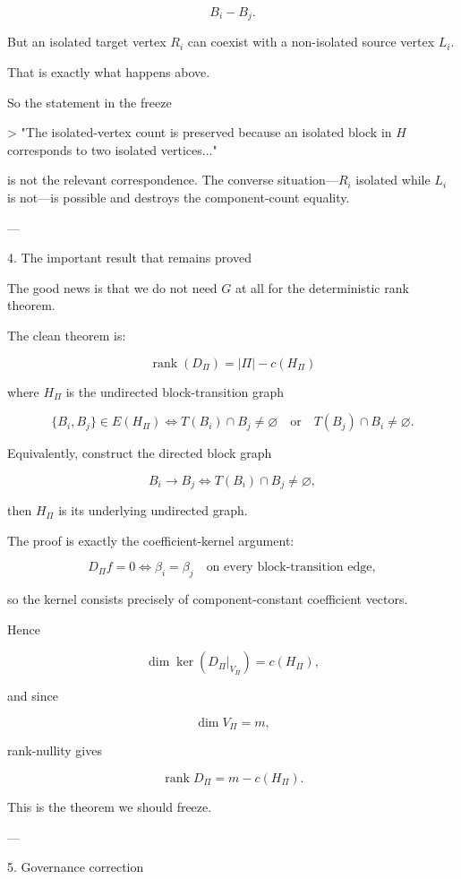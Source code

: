 \[
B_i-B_j.
\]

But an isolated target vertex \(R_i\) can coexist with a non-isolated source vertex \(L_i\).

That is exactly what happens above.

So the statement in the freeze

> "The isolated-vertex count is preserved because an isolated block in \(H\) corresponds to two isolated vertices..."



is not the relevant correspondence. The converse situation—\(R_i\) isolated while \(L_i\) is not—is possible and destroys the component-count equality.


---

4. The important result that remains proved

The good news is that we do not need \(G\) at all for the deterministic rank theorem.

The clean theorem is:

\[
\boxed{
\operatorname{rank}(D_\Pi)
=
|\Pi|-c(H_\Pi)
}
\]

where \(H_\Pi\) is the undirected block-transition graph

\[
\{B_i,B_j\}\in E(H_\Pi)
\iff
T(B_i)\cap B_j\neq\varnothing
\quad\text{or}\quad
T(B_j)\cap B_i\neq\varnothing.
\]

Equivalently, construct the directed block graph

\[
B_i\longrightarrow B_j
\iff
T(B_i)\cap B_j\neq\varnothing,
\]

then \(H_\Pi\) is its underlying undirected graph.

The proof is exactly the coefficient-kernel argument:

\[
D_\Pi f=0
\iff
\beta_i=\beta_j
\quad\text{on every block-transition edge},
\]

so the kernel consists precisely of component-constant coefficient vectors.

Hence

\[
\dim\ker(D_\Pi|_{V_\Pi})=c(H_\Pi),
\]

and since

\[
\dim V_\Pi=m,
\]

rank-nullity gives

\[
\boxed{\operatorname{rank}D_\Pi=m-c(H_\Pi)}.
\]

This is the theorem we should freeze.


---

5. Governance correction

